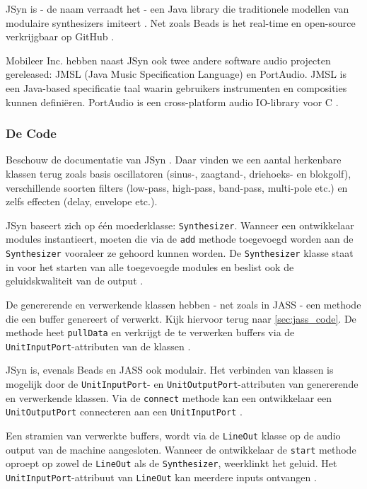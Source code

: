 JSyn is - de naam verraadt het - een Java library die traditionele modellen van modulaire synthesizers imiteert \autocite{jsyn}. Net zoals Beads is het real-time en open-source verkrijgbaar op GitHub \autocite{jsyngit}.

Mobileer Inc. hebben naast JSyn ook twee andere software audio projecten gereleased: JMSL (Java Music Specification Language) en PortAudio. JMSL is een Java-based specificatie taal waarin gebruikers instrumenten en composities kunnen definiëren. PortAudio is een cross-platform audio IO-library voor C \autocite{jsyn}.

\subsubsection*{De Code}

Beschouw de documentatie van JSyn \autocite{jsyndocs}. Daar vinden we een aantal herkenbare klassen terug zoals basis oscillatoren (sinus-, zaagtand-, driehoeks- en blokgolf), verschillende soorten filters (low-pass, high-pass, band-pass, multi-pole etc.) en zelfs effecten (delay, envelope etc.).

JSyn baseert zich op één moederklasse: \verb+Synthesizer+. Wanneer een ontwikkelaar modules instantieert, moeten die via de \verb+add+ methode toegevoegd worden aan de \verb+Synthesizer+ vooraleer ze gehoord kunnen worden. De \verb+Synthesizer+ klasse staat in voor het starten van alle toegevoegde modules en beslist ook de geluidskwaliteit van de output \autocite{jsyndocs}.

De genererende en verwerkende klassen hebben - net zoals in JASS - een methode die een buffer genereert of verwerkt. Kijk hiervoor terug naar \ref{sec:jass_code}. De methode heet \verb+pullData+ en verkrijgt de te verwerken buffers via de \verb+UnitInputPort+-attributen van de klassen \autocite{jsyndocs}.

JSyn is, evenals Beads en JASS ook modulair. Het verbinden van klassen is mogelijk door de \verb+UnitInputPort+- en \verb+UnitOutputPort+-attributen van genererende en verwerkende klassen. Via de \verb+connect+ methode kan een ontwikkelaar een \verb+UnitOutputPort+ connecteren aan een \verb+UnitInputPort+ \autocite{jsyndocs}.

Een stramien van verwerkte buffers, wordt via de \verb+LineOut+ klasse op de audio output van de machine aangesloten. Wanneer de ontwikkelaar de \verb+start+ methode oproept op zowel de \verb+LineOut+ als de \verb+Synthesizer+, weerklinkt het geluid. Het \verb+UnitInputPort+-attribuut van \verb+LineOut+ kan meerdere inputs ontvangen \autocite{jsyndocs}.

